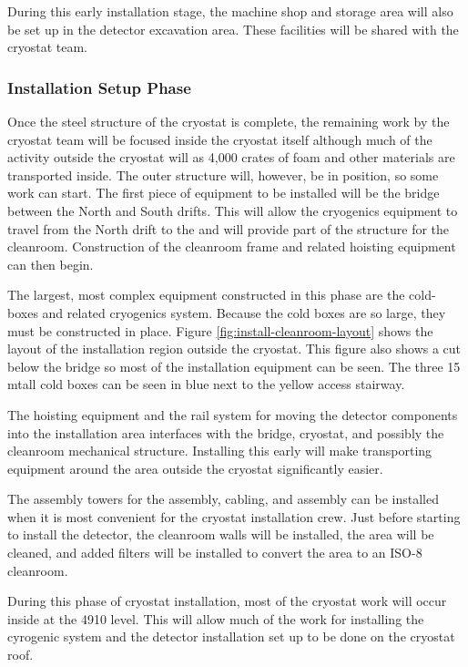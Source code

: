 During this early installation stage, the machine shop and  storage area will also be set up in the detector excavation area. These facilities will be shared with the cryostat team. 

\subsubsection{Installation Setup Phase}

Once the steel structure of the cryostat is complete, the remaining work by the cryostat team will be focused inside the cryostat itself although 
much of the activity outside the cryostat will as 4,000 crates of foam and other materials are transported inside. The outer structure will, however, be in position, so some  work can start. 
The first piece of equipment to be installed will be the bridge between the North and South drifts. 
This will allow the cryogenics equipment to travel from the North drift to the  and will provide part of the structure for the cleanroom. 
Construction of the cleanroom frame and related hoisting equipment can then begin. 

The largest, most complex equipment constructed in this phase are the cold-boxes and related cryogenics system. 
Because the cold boxes are so large, they must be constructed in place. 
Figure \ref{fig:install-cleanroom-layout} shows the layout of the installation region outside the cryostat. 
This figure also shows a cut below the bridge so most of the installation equipment can be seen. 
The three 15 \si{m}tall cold boxes can be seen in blue next to the yellow access stairway. 

The hoisting equipment and the rail system for moving the detector components into the installation area interfaces with the bridge, cryostat, and possibly the cleanroom mechanical structure. 
Installing this early will make transporting equipment around the area outside the cryostat significantly easier. 
 
The assembly towers for the  assembly,  cabling, and  assembly can be installed when it is most convenient for the cryostat installation crew. 
Just before starting to install the detector, the cleanroom walls will be installed, the area will be cleaned, and added filters will be installed to convert the area to an ISO-8 cleanroom.

During this phase of cryostat installation, most of the cryostat work will occur inside at the 4910 level. 
This will allow much of the work for installing the cyrogenic system and the detector installation set up to be done on the cryostat roof. 

